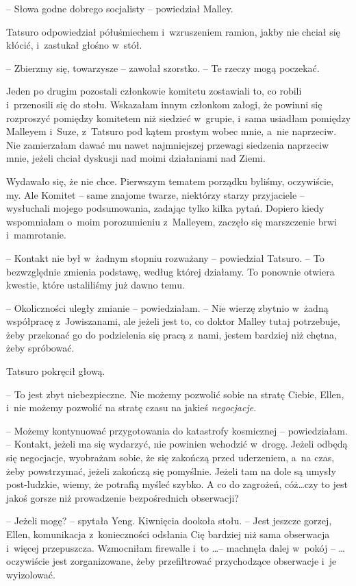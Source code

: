 \documentclass[oneside,polish,11pt,sfheadings]{mwbk}
\begin{document}
-- Słowa godne dobrego socjalisty -- powiedział Malley.

Tatsuro odpowiedział półuśmiechem i~wzruszeniem ramion, jakby nie chciał
się kłócić, i~zastukał głośno w~stół.

-- Zbierzmy się, towarzysze -- zawołał szorstko. -- Te rzeczy mogą
poczekać.

Jeden po drugim pozostali członkowie komitetu zostawiali to, co robili i~przenosili się do stołu. Wskazałam innym członkom załogi, że powinni się
rozproszyć pomiędzy komitetem niż siedzieć w~grupie, i~sama usiadłam
pomiędzy Malleyem i~Suze, z~Tatsuro pod kątem prostym wobec mnie, a~nie
naprzeciw. Nie zamierzałam dawać mu nawet najmniejszej przewagi
siedzenia naprzeciw mnie, jeżeli chciał dyskusji nad moimi działaniami
nad Ziemi.

Wydawało się, że nie chce. Pierwszym tematem porządku byliśmy,
oczywiście, my. Ale Komitet -- same znajome twarze, niektórzy starzy
przyjaciele -- wysłuchali mojego podsumowania, zadając tylko kilka pytań.
Dopiero kiedy wspomniałam o~moim porozumieniu z~Malleyem, zaczęło się
marszczenie brwi i~mamrotanie.

-- Kontakt nie był w~żadnym stopniu rozważany -- powiedział Tatsuro. -- To
bezwzględnie zmienia podstawę, według której działamy. To ponownie
otwiera kwestie, które ustaliliśmy już dawno temu.

-- Okoliczności uległy zmianie -- powiedziałam. -- Nie wierzę zbytnio w~żadną współpracę z~Jowiszanami, ale jeżeli jest to, co doktor Malley
tutaj potrzebuje, żeby przekonać go do podzielenia się pracą z~nami,
jestem bardziej niż chętna, żeby spróbować.

Tatsuro pokręcił głową. 

-- To jest zbyt niebezpieczne. Nie możemy
pozwolić sobie na stratę Ciebie, Ellen, i~nie możemy pozwolić na stratę
czasu na jakieś \textit{negocjacje}.

-- Możemy kontynuować przygotowania do katastrofy kosmicznej -- powiedziałam. -- Kontakt, jeżeli ma się wydarzyć, nie powinien wchodzić w~drogę. Jeżeli odbędą się negocjacje, wyobrażam sobie, że się zakończą
przed uderzeniem, a~na czas, żeby powstrzymać, jeżeli zakończą się
pomyślnie. Jeżeli tam na dole są umysły post-ludzkie, wiemy, że potrafią
myśleć szybko. A co do zagrożeń, cóż\ldots  czy to jest jakoś gorsze niż
prowadzenie bezpośrednich obserwacji?

-- Jeżeli mogę? -- spytała Yeng. Kiwnięcia dookoła stołu. -- Jest jeszcze
gorzej, Ellen, komunikacja z~konieczności odsłania Cię bardziej niż sama
obserwacja i~więcej przepuszcza. Wzmocniłam firewalle i~to \ldots  -- machnęła dalej w~pokój -- \ldots  oczywiście jest zorganizowane, żeby
przefiltrować przychodzące obserwacje i~je wyizolować.
\end{document}
